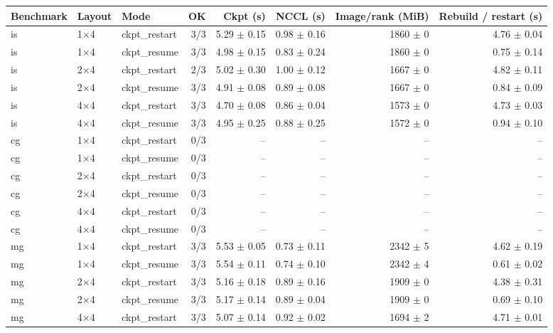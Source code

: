 \begin{tabular}{lllrrrrr}
\toprule
Benchmark & Layout & Mode & OK & Ckpt (s) & NCCL (s) & Image/rank (MiB) & Rebuild / restart (s) \\
\midrule
is & 1$\times$4 & ckpt\_restart & 3/3 & 5.29 $\pm$ 0.15 & 0.98 $\pm$ 0.16 & 1860 $\pm$ 0 & 4.76 $\pm$ 0.04 \\
is & 1$\times$4 & ckpt\_resume & 3/3 & 4.98 $\pm$ 0.15 & 0.83 $\pm$ 0.24 & 1860 $\pm$ 0 & 0.75 $\pm$ 0.14 \\
is & 2$\times$4 & ckpt\_restart & 2/3 & 5.02 $\pm$ 0.30 & 1.00 $\pm$ 0.12 & 1667 $\pm$ 0 & 4.82 $\pm$ 0.11 \\
is & 2$\times$4 & ckpt\_resume & 3/3 & 4.91 $\pm$ 0.08 & 0.89 $\pm$ 0.08 & 1667 $\pm$ 0 & 0.84 $\pm$ 0.09 \\
is & 4$\times$4 & ckpt\_restart & 3/3 & 4.70 $\pm$ 0.08 & 0.86 $\pm$ 0.04 & 1573 $\pm$ 0 & 4.73 $\pm$ 0.03 \\
is & 4$\times$4 & ckpt\_resume & 3/3 & 4.95 $\pm$ 0.25 & 0.88 $\pm$ 0.25 & 1572 $\pm$ 0 & 0.94 $\pm$ 0.10 \\
cg & 1$\times$4 & ckpt\_restart & 0/3 & -- & -- & -- & -- \\
cg & 1$\times$4 & ckpt\_resume & 0/3 & -- & -- & -- & -- \\
cg & 2$\times$4 & ckpt\_restart & 0/3 & -- & -- & -- & -- \\
cg & 2$\times$4 & ckpt\_resume & 0/3 & -- & -- & -- & -- \\
cg & 4$\times$4 & ckpt\_restart & 0/3 & -- & -- & -- & -- \\
cg & 4$\times$4 & ckpt\_resume & 0/3 & -- & -- & -- & -- \\
mg & 1$\times$4 & ckpt\_restart & 3/3 & 5.53 $\pm$ 0.05 & 0.73 $\pm$ 0.11 & 2342 $\pm$ 5 & 4.62 $\pm$ 0.19 \\
mg & 1$\times$4 & ckpt\_resume & 3/3 & 5.54 $\pm$ 0.11 & 0.74 $\pm$ 0.10 & 2342 $\pm$ 4 & 0.61 $\pm$ 0.02 \\
mg & 2$\times$4 & ckpt\_restart & 3/3 & 5.16 $\pm$ 0.18 & 0.89 $\pm$ 0.16 & 1909 $\pm$ 0 & 4.38 $\pm$ 0.31 \\
mg & 2$\times$4 & ckpt\_resume & 3/3 & 5.17 $\pm$ 0.14 & 0.89 $\pm$ 0.04 & 1909 $\pm$ 0 & 0.69 $\pm$ 0.10 \\
mg & 4$\times$4 & ckpt\_restart & 3/3 & 5.07 $\pm$ 0.14 & 0.92 $\pm$ 0.02 & 1694 $\pm$ 2 & 4.71 $\pm$ 0.01 \\

\end{tabular}
